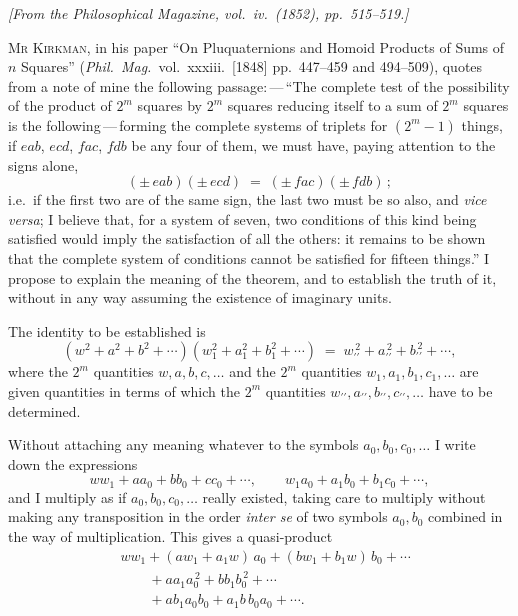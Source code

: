 \documentclass[11pt]{article}
\begin{document}
\noindent\emph{[From the Philosophical Magazine, vol.\ iv.\ (1852), pp.\ 515--519.]}

\bigskip

\noindent\textsc{Mr Kirkman}, in his paper ``On Pluquaternions and Homoid Products of Sums of $n$ Squares'' (\emph{Phil.\ Mag.}\ vol.\ xxxiii.\ [1848] pp.\ 447--459 and 494--509), quotes from a note of mine the following passage:\,---\,``The complete test of the possibility of the product of $2^{m}$ squares by $2^{m}$ squares reducing itself to a sum of $2^{m}$ squares is the following\,---\,forming the complete systems of triplets for $(2^{m}-1)$ things, if $eab$, $ecd$, $fac$, $fdb$ be any four of them, we must have, paying attention to the signs alone,
\[
(\pm\, eab)(\pm\, ecd) \;=\; (\pm\, fac)(\pm\, fdb)\,;
\]
i.e.\ if the first two are of the same sign, the last two must be so also, and \emph{vice versa}; I believe that, for a system of seven, two conditions of this kind being satisfied would imply the satisfaction of all the others: it remains to be shown that the complete system of conditions cannot be satisfied for fifteen things.'' I propose to explain the meaning of the theorem, and to establish the truth of it, without in any way assuming the existence of imaginary units.

The identity to be established is
\[
(w^{2} + a^{2} + b^{2} + \cdots)(w_{1}^{2} + a_{1}^{2} + b_{1}^{2} + \cdots) \;=\; w_{\prime\prime}^{\,2} + a_{\prime\prime}^{\,2} + b_{\prime\prime}^{\,2} + \cdots,
\]
where the $2^{m}$ quantities $w, a, b, c, \ldots$ and the $2^{m}$ quantities $w_{1}, a_{1}, b_{1}, c_{1}, \ldots$ are given quantities in terms of which the $2^{m}$ quantities $w_{\prime\prime}, a_{\prime\prime}, b_{\prime\prime}, c_{\prime\prime}, \ldots$ have to be determined.

Without attaching any meaning whatever to the symbols $a_{0}, b_{0}, c_{0}, \ldots$ I write down the expressions
\[
w w_{1} + a a_{0} + b b_{0} + c c_{0} + \cdots,\qquad w_{1} a_{0} + a_{1} b_{0} + b_{1} c_{0} + \cdots,
\]
and I multiply as if $a_{0}, b_{0}, c_{0}, \ldots$ really existed, taking care to multiply without making any transposition in the order \emph{inter se} of two symbols $a_{0}, b_{0}$ combined in the way of multiplication. This gives a quasi-product
\begin{align*}
& w w_{1} + (a w_{1} + a_{1} w)\,a_{0} + (b w_{1} + b_{1} w)\,b_{0} + \cdots\\
& \qquad + a a_{1} a_{0}^{\,2} + b b_{1} b_{0}^{\,2} + \cdots\\
& \qquad + a b_{1} a_{0} b_{0} + a_{1} b\,b_{0} a_{0} + \cdots.
\end{align*}
\end{document}
